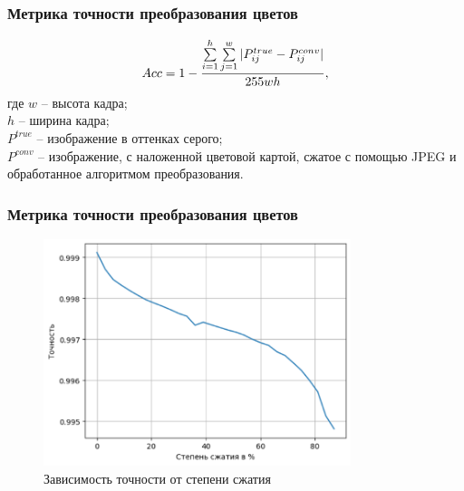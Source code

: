 \documentclass[t]{beamer}
\begin{document}
	\begin{frame}
		\frametitle{Метрика точности преобразования цветов}
		\begin{equation}
			Acc = 1 - \frac{\sum\limits_{i=1}^h \sum\limits_{j=1}^w |P^{true}_{ij} - P^{conv}_{ij}|}{255wh},
			\label{eq:flanaccuracy}	
			\vspace*{0.2cm}
		\end{equation}
		где $w$ -- высота кадра;\\ \hfill \break
		\hspace*{0.65cm}$h$ -- ширина кадра;\\ \hfill \break
		\hspace*{0.65cm}$P^{true}$ -- изображение в оттенках серого;\\ \hfill \break
		\hspace*{0.65cm}$P^{conv}$ -- изображение, с наложенной цветовой картой, сжатое с помощью JPEG и обработанное алгоритмом преобразования. 
	\end{frame}

	\begin{frame}
		\frametitle{Метрика точности преобразования цветов}
		\vspace*{-0.35cm}
		\begin{figure}[h!]
			\centering
			\includegraphics[width = 0.8\textwidth]{image/accuracy_plot}	
			\caption{Зависимость точности от степени сжатия}
			\label{fig:fullprepare}
		\end{figure}
	
	\end{frame}
\end{document}
